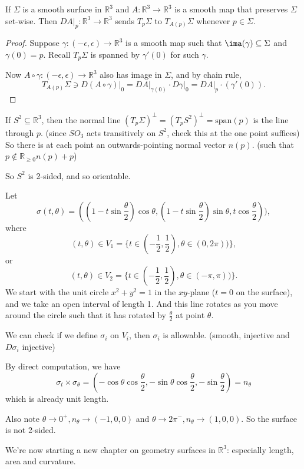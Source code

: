 \begin{lemma}{}{}
    If \(\Sigma\) is a smooth surface in \(\mathbb{R}^3\) and \(A: \mathbb{R}^3 \to \mathbb{R}^3\) is a smooth map that preserves \(\Sigma\) set-wise. Then
    \(\left.DA\right|_p:\mathbb{R}^3 \to \mathbb{R}^3\) sends \(T_p\Sigma\) to \(T_{A(p)}\Sigma\) whenever \(p \in \Sigma\).
\end{lemma}
\begin{proof}
    Suppose \(\gamma:(-\epsilon, \epsilon)\to \mathbb{R}^3\) is a smooth map such that \(\ima(\gamma)\subseteq \Sigma\) and \(\gamma(0)=p\). Recall \(T_p\Sigma\) is spanned by \(\gamma'(0)\) for such \(\gamma\).

    Now \(A \circ \gamma: (-\epsilon,\epsilon) \to \mathbb{R}^3\) also has image in \(\Sigma\), and by chain rule,
    \[
        T_{A(p)}\Sigma \ni \left.D(A\circ \gamma)\right|_0 = \left.DA\right|_{\gamma(0)}\cdot \left.D\gamma\right|_0 = \left.DA\right|_p\cdot(\gamma'(0)).
    \]
\end{proof}
\begin{example}
    If \(S^2 \subseteq \mathbb{R}^3\), then the normal line \((T_p\Sigma)^\perp = (T_p S^2)^\perp = \mathrm{span}(p)\) is the line through \(p\). (since \(SO_3\) acts transitively on \(S^2\), check this at the one point suffices) So there is at each point an outwards-pointing normal vector \(n(p)\). (such that \(p \notin \mathbb{R}_{\geq 0}n(p) + p\))

    So \(S^2\) is 2-sided, and so orientable.
\end{example}
\begin{example}
    Let
    \[\sigma(t, \theta) = ((1 - t\sin \frac{\theta}{2})\cos \theta, (1 - t\sin \frac{\theta}{2})\sin \theta,t\cos \frac{\theta}{2})),\]
    where
    \[
        (t,\theta) \in V_1 = \{t \in (-\frac{1}{2},\frac{1}{2}), \theta \in (0, 2\pi))\},
    \]
    or
    \[
        (t,\theta) \in V_2 = \{t \in (-\frac{1}{2},\frac{1}{2}), \theta \in (-\pi, \pi))\}.
    \]
    We start with the unit circle \(x^2 + y^2 = 1\) in the \(xy\)-plane (\(t=0\) on the surface), and we take an open interval of length 1. And this line rotates as you move around the circle such that it has rotated by \(\frac{\theta}{2}\) at point \(\theta\).

    We can check if we define \(\sigma_i\) on \(V_i\), then \(\sigma_i\) is allowable. (smooth, injective and \(D\sigma_i\) injective)

    By direct computation, we have
    \[
        \sigma_t \times \sigma_\theta = (-\cos \theta \cos \frac{\theta}{2}, - \sin \theta \cos \frac{\theta}{2}, -\sin \frac{\theta}{2}) = n_\theta
    \]
    which is already unit length.

    Also note \(\theta \to 0^+, n_\theta \to (-1,0,0)\) and \(\theta \to 2\pi^-, n_\theta \to (1,0,0)\). So the surface is not 2-sided.
\end{example}
We're now starting a new chapter on geometry surfaces in \(\mathbb{R}^3\): especially length, area and curvature.

